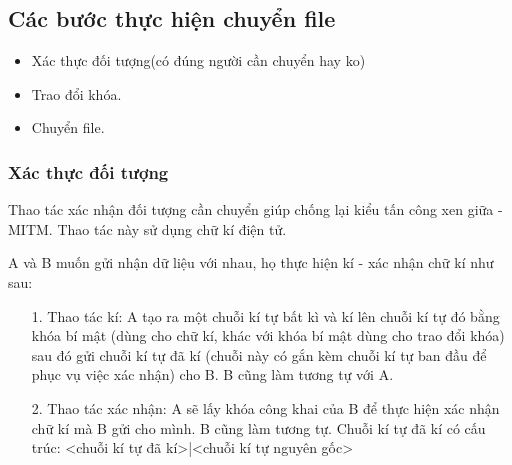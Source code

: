 \documentclass[a4paper,12pt]{report}
\begin{document}
\subsection*{Các bước thực hiện chuyển file}
\begin{itemize}
\item Xác thực đối tượng(có đúng người cần chuyển hay ko)
\item Trao đổi khóa.
\item Chuyển file.
\end{itemize}
\subsubsection*{Xác thực đối tượng}
Thao tác xác nhận đối tượng cần chuyển giúp chống lại kiểu tấn công xen giữa - MITM.
Thao tác này sử dụng chữ kí điện tử.

A và B muốn gửi nhận dữ liệu với nhau, họ thực hiện kí - xác nhận chữ kí như sau:
\begin{itemize}
\item[1. ] Thao tác kí: A tạo ra một chuỗi kí tự bất kì và kí lên chuỗi kí tự đó bằng khóa bí mật (dùng cho chữ kí, khác với khóa bí mật dùng cho trao đổi khóa) sau đó gửi chuỗi kí tự đã kí (chuỗi này có gắn kèm chuỗi kí tự ban đầu để phục vụ việc xác nhận) cho B. B cũng làm tương tự với A.
\item[2. ] Thao tác xác nhận: A sẽ lấy khóa công khai của B để thực hiện xác nhận chữ kí mà B gửi cho mình. B cũng làm tương tự. Chuỗi kí tự đã kí có cấu trúc: <chuỗi kí tự đã kí>|<chuỗi kí tự nguyên gốc>
\end{itemize}
\end{document}
